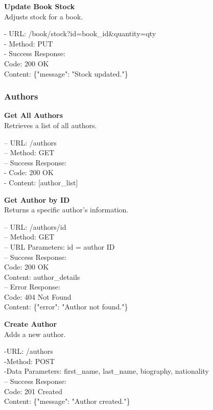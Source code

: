 \begin{flushleft}
\textbf{Update Book Stock} \\
Adjusts stock for a book.

- URL: /book/stock?id={book\_id}\&quantity={qty} \\
- Method: PUT \\
- Success Response: \\
Code: 200 OK \\
Content: \{"message": "Stock updated."\}
\end{flushleft}

\subsubsection*{Authors}
\begin{flushleft}
\textbf{Get All Authors} \\
Retrieves a list of all authors.

– URL: /authors \\
– Method: GET \\
– Success Response: \\
- Code: 200 OK \\
- Content: [author\_list]
\end{flushleft}

\begin{flushleft}
\textbf{Get Author by ID} \\
Returns a specific author's information.

– URL: /authors/{id} \\
– Method: GET \\
– URL Parameters: id = author ID \\
– Success Response: \\
Code: 200 OK \\
Content: {author\_details} \\
– Error Response: \\
Code: 404 Not Found \\
Content: \{"error": "Author not found."\}
\end{flushleft}

\begin{flushleft}
\textbf{Create Author} \\
Adds a new author.

-URL: /authors \\
-Method: POST \\
-Data Parameters: first\_name, last\_name, biography, nationality \\
– Success Response: \\
Code: 201 Created \\
Content: \{"message": "Author created."\}
\end{flushleft}

